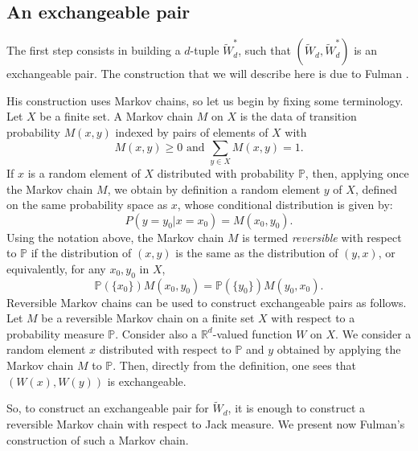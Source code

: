 \documentclass[11pt]{amsart}
\theoremstyle{plain}
\theoremstyle{remark}
\newcommand{\RR}{\mathbb{R}}
\newcommand{\PP}{\mathbb{P}}
\begin{document}
\subsection{An exchangeable pair}

The first step consists in building a $d$-tuple $\tilde{W}_d^*$,
such that $(\tilde{W}_d,\tilde{W}_d^*)$ is an exchangeable pair.
The construction that we will describe here is due to Fulman
\cite{FulmanFluctuationChA2}.

His construction uses Markov chains, so let us begin by fixing some terminology.
Let $X$ be a finite set.
A Markov chain $M$ on $X$ is the data of transition probability $M(x,y)$
indexed by pairs of elements of $X$ with
\[M(x,y) \ge 0 \text{ and } \sum_{y \in X} M(x,y) =1.\]
If $x$ is a random element of $X$ distributed with probability $\PP$,
then, applying once the Markov chain $M$, we obtain by definition
a random element $y$ of $X$, defined on the same probability space as $x$,
whose conditional distribution is given by:
\[P ( y= y_0 | x=x_0 ) = M(x_0,y_0).\]
Using the notation above,
the Markov chain $M$ is termed {\em reversible} with respect to $\PP$ if
the distribution of $(x,y)$ is the same as the distribution of $(y,x)$, or
equivalently, for any $x_0,y_0$ in $X$,
\[\PP(\{x_0\}) M(x_0,y_0) = \PP(\{y_0\}) M(y_0,x_0).\]
Reversible Markov chains can be used to construct exchangeable pairs as follows.
Let $M$ be a reversible Markov chain on a finite set $X$ with respect to
a probability measure $\PP$.
Consider also a $\RR^d$-valued function $W$ on $X$.
We consider a random element $x$ distributed with respect to $\PP$
and $y$ obtained by applying the Markov chain $M$ to $\PP$.
Then, directly from the definition, one sees that $(W(x),W(y))$ is exchangeable.

So, to construct an exchangeable pair for $\tilde{W}_d$,
it is enough to construct a reversible Markov chain 
with respect to Jack measure.
We present now Fulman's construction of such a Markov chain.
\end{document}
